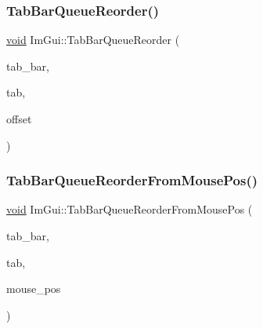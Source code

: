 \mbox{\label{namespaceImGui_a5e17096f27a46767960124e7c7fa848b}} 
\subsubsection{\texorpdfstring{Tab\+Bar\+Queue\+Reorder()}{TabBarQueueReorder()}}
{\footnotesize\ttfamily \hyperlink{imgui__impl__opengl3__loader_8h_ac668e7cffd9e2e9cfee428b9b2f34fa7}{void} Im\+Gui\+::\+Tab\+Bar\+Queue\+Reorder (\begin{DoxyParamCaption}\item[{\hyperlink{structImGuiTabBar}{Im\+Gui\+Tab\+Bar} $\ast$}]{tab\+\_\+bar,  }\item[{const \hyperlink{structImGuiTabItem}{Im\+Gui\+Tab\+Item} $\ast$}]{tab,  }\item[{int}]{offset }\end{DoxyParamCaption})}

\mbox{\label{namespaceImGui_af2003678c224a700962f99e02b273a86}} 
\subsubsection{\texorpdfstring{Tab\+Bar\+Queue\+Reorder\+From\+Mouse\+Pos()}{TabBarQueueReorderFromMousePos()}}
{\footnotesize\ttfamily \hyperlink{imgui__impl__opengl3__loader_8h_ac668e7cffd9e2e9cfee428b9b2f34fa7}{void} Im\+Gui\+::\+Tab\+Bar\+Queue\+Reorder\+From\+Mouse\+Pos (\begin{DoxyParamCaption}\item[{\hyperlink{structImGuiTabBar}{Im\+Gui\+Tab\+Bar} $\ast$}]{tab\+\_\+bar,  }\item[{const \hyperlink{structImGuiTabItem}{Im\+Gui\+Tab\+Item} $\ast$}]{tab,  }\item[{\hyperlink{structImVec2}{Im\+Vec2}}]{mouse\+\_\+pos }\end{DoxyParamCaption})}

\mbox{\label{namespaceImGui_a3340d8c07dca35527b618288f091a0f7}} 
